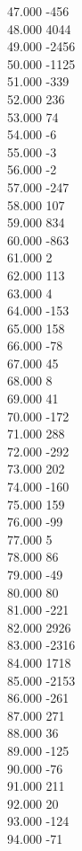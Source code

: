 { 47.000	-456 \\
 48.000	4044 \\
 49.000	-2456 \\
 50.000	-1125 \\
 51.000	-339 \\
 52.000	236 \\
 53.000	74 \\
 54.000	-6 \\
 55.000	-3 \\
 56.000	-2 \\
 57.000	-247 \\
 58.000	107 \\
 59.000	834 \\
 60.000	-863 \\
 61.000	2 \\
 62.000	113 \\
 63.000	4 \\
 64.000	-153 \\
 65.000	158 \\
 66.000	-78 \\
 67.000	45 \\
 68.000	8 \\
 69.000	41 \\
 70.000	-172 \\
 71.000	288 \\
 72.000	-292 \\
 73.000	202 \\
 74.000	-160 \\
 75.000	159 \\
 76.000	-99 \\
 77.000	5 \\
 78.000	86 \\
 79.000	-49 \\
 80.000	80 \\
 81.000	-221 \\
 82.000	2926 \\
 83.000	-2316 \\
 84.000	1718 \\
 85.000	-2153 \\
 86.000	-261 \\
 87.000	271 \\
 88.000	36 \\
 89.000	-125 \\
 90.000	-76 \\
 91.000	211 \\
 92.000	20 \\
 93.000	-124 \\
 94.000	-71 \\
}

